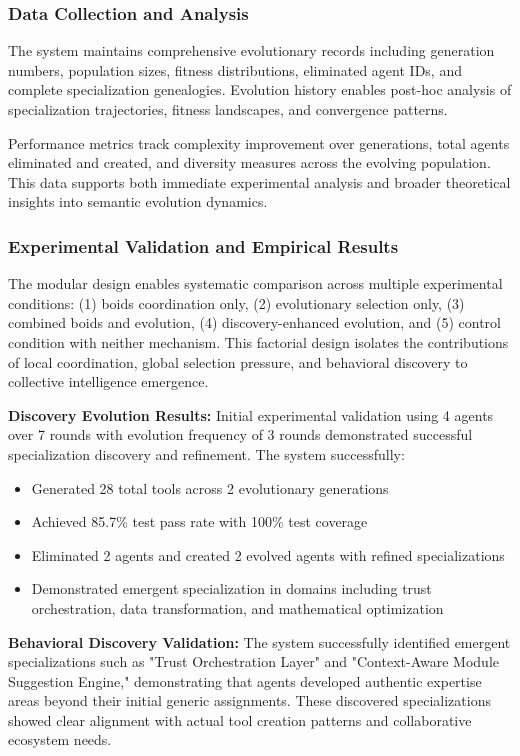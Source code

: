 \subsubsection{Data Collection and Analysis}

The system maintains comprehensive evolutionary records including generation numbers, population sizes, fitness distributions, eliminated agent IDs, and complete specialization genealogies. Evolution history enables post-hoc analysis of specialization trajectories, fitness landscapes, and convergence patterns.

Performance metrics track complexity improvement over generations, total agents eliminated and created, and diversity measures across the evolving population. This data supports both immediate experimental analysis and broader theoretical insights into semantic evolution dynamics.

\subsubsection{Experimental Validation and Empirical Results}

The modular design enables systematic comparison across multiple experimental conditions: (1) boids coordination only, (2) evolutionary selection only, (3) combined boids and evolution, (4) discovery-enhanced evolution, and (5) control condition with neither mechanism. This factorial design isolates the contributions of local coordination, global selection pressure, and behavioral discovery to collective intelligence emergence.

\textbf{Discovery Evolution Results:} Initial experimental validation using 4 agents over 7 rounds with evolution frequency of 3 rounds demonstrated successful specialization discovery and refinement. The system successfully:
\begin{itemize}
    \item Generated 28 total tools across 2 evolutionary generations
    \item Achieved 85.7\% test pass rate with 100\% test coverage
    \item Eliminated 2 agents and created 2 evolved agents with refined specializations
    \item Demonstrated emergent specialization in domains including trust orchestration, data transformation, and mathematical optimization
\end{itemize}

\textbf{Behavioral Discovery Validation:} The system successfully identified emergent specializations such as "Trust Orchestration Layer" and "Context-Aware Module Suggestion Engine," demonstrating that agents developed authentic expertise areas beyond their initial generic assignments. These discovered specializations showed clear alignment with actual tool creation patterns and collaborative ecosystem needs.

